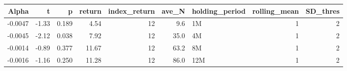 \begin{table}[ht]
\centering
\begin{tabular}{rrrrrrlrr}
  \hline
Alpha & t & p & return & index\_return & ave\_N & holding\_period & rolling\_mean & SD\_thres \\ 
  \hline
-0.0047 & -1.33 & 0.189 & 4.54 & 12 & 9.6 & 1M &  1 &  2 \\ 
  -0.0045 & -2.12 & 0.038 & 7.92 & 12 & 35.0 & 4M &  1 &  2 \\ 
  -0.0014 & -0.89 & 0.377 & 11.67 & 12 & 63.2 & 8M &  1 &  2 \\ 
  -0.0016 & -1.16 & 0.250 & 11.28 & 12 & 86.0 & 12M &  1 &  2 \\ 
   \hline
\end{tabular}
\end{table}

